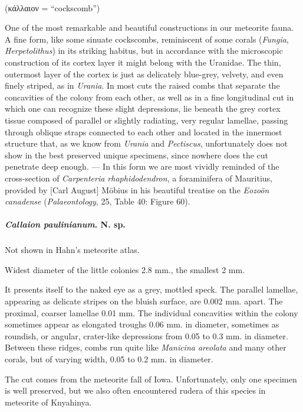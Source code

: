 \documentclass[a4paper, 12pt, oneside]{article}
\begin{document}
\paragraph*{}
(κάλλαιον = ``cockscomb'')%

One of the most remarkable and beautiful constructions in our meteorite fauna. A fine form, like some sinuate cockscombs, reminiscent of some corals (\emph{Fungia}, \emph{Herpetolithus}) in its striking habitus, but in accordance with the microscopic construction of its cortex layer it might belong with the Uranidae. The thin, outermost layer of the cortex is just as delicately blue-grey, velvety, and even finely striped, as in \emph{Urania}. In most cuts the raised combs that separate the concavities of the colony from each other, as well as in a fine longitudinal cut in which one can recognize these slight depressions, lie beneath the grey cortex tissue composed of parallel or slightly radiating, very regular lamellae, passing through oblique straps connected to each other and located in the innermost structure that, as we know from \emph{Urania} and \emph{Pectiscus}, unfortunately does not show in the best preserved unique specimens, since nowhere does the cut penetrate deep enough. --- In this form we are most vividly reminded of the cross-section of \emph{Carpenteria rhaphidodendron}, a foraminifera of Mauritius, provided by [Carl August] Möbius in his beautiful treatise on the \emph{Eozoön canadense} (\emph{Palaeontology}, 25, Table 40: Figure 60).
\paragraph{\emph{Callaion paulinianum}. N. sp.}
\subparagraph{}
Not shown in Hahn's meteorite atlas.

Widest diameter of the little colonies 2.8 mm., the smallest 2 mm.

It presents itself to the naked eye as a grey, mottled speck. The parallel lamellae, appearing as delicate stripes on the bluish surface, are 0.002 mm. apart. The proximal, coarser lamellae 0.01 mm. The individual concavities within the colony sometimes appear as elongated troughs 0.06 mm. in diameter, sometimes as roundish, or angular, crater-like depressions from 0.05 to 0.3 mm. in diameter. Between these ridges, combs run quite like \emph{Manicina areolata} and many other corals, but of varying width, 0.05 to 0.2 mm. in diameter.

The cut comes from the meteorite fall of Iowa. Unfortunately, only one specimen is well preserved, but we also often encountered rudera of this species in meteorite of Knyahinya.
\end{document}
